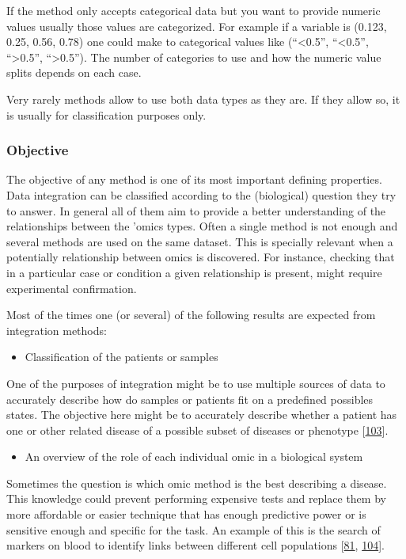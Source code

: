 \documentclass[
  12pt,
  a4paper,
  twoside,
  openright]{book}
\providecommand{\tightlist}{%
  \setlength{\itemsep}{0pt}\setlength{\parskip}{0pt}}
\begin{document}
If the method only accepts categorical data but you want to provide numeric values usually those values are categorized.
For example if a variable is (0.123, 0.25, 0.56, 0.78) one could make to categorical values like (``\textless0.5'', ``\textless0.5'', ``\textgreater0.5'', ``\textgreater0.5'').
The number of categories to use and how the numeric value splits depends on each case.

Very rarely methods allow to use both data types as they are.
If they allow so, it is usually for classification purposes only.

\hypertarget{objective}{%
\subsubsection{Objective}\label{objective}}

The objective of any method is one of its most important defining properties.
Data integration can be classified according to the (biological) question they try to answer.
In general all of them aim to provide a better understanding of the relationships between the 'omics types.
Often a single method is not enough and several methods are used on the same dataset.
This is specially relevant when a potentially relationship between omics is discovered.
For instance, checking that in a particular case or condition a given relationship is present, might require experimental confirmation.

Most of the times one (or several) of the following results are expected from integration methods:

\begin{itemize}
\tightlist
\item
  Classification of the patients or samples
\end{itemize}

One of the purposes of integration might be to use multiple sources of data to accurately describe how do samples or patients fit on a predefined possibles states.
The objective here might be to accurately describe whether a patient has one or other related disease of a possible subset of diseases or phenotype {[}\protect\hyperlink{ref-rohart2016}{103}{]}.

\begin{itemize}
\tightlist
\item
  An overview of the role of each individual omic in a biological system
\end{itemize}

Sometimes the question is which omic method is the best describing a disease.
This knowledge could prevent performing expensive tests and replace them by more affordable or easier technique that has enough predictive power or is sensitive enough and specific for the task.
An example of this is the search of markers on blood to identify links between different cell populations {[}\protect\hyperlink{ref-tang2017}{81}, \protect\hyperlink{ref-ibrahim2017}{104}{]}.
\end{document}
